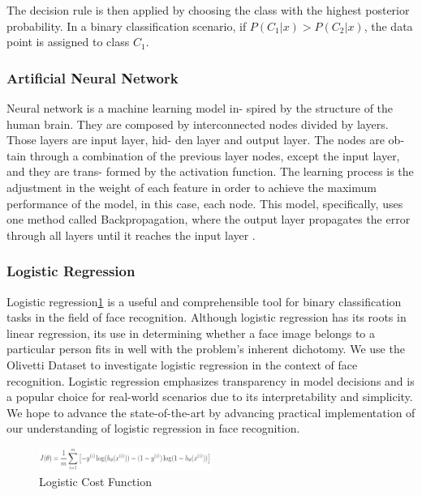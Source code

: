 \documentclass[12pt,a4paper,twocolumn]{article}
\begin{document}
The decision rule is then applied by choosing the class with the highest posterior probability. In a binary classification scenario, if \( P(C_1 | x) > P(C_2 | x) \), the data point is assigned to class \( C_1 \).
\cite{scikit-learn}
\subsubsection{Artificial Neural Network}
\par Neural network is a machine learning model in-
spired by the structure of the human brain. They
are composed by interconnected nodes divided
by layers. Those layers are input layer, hid-
den layer and output layer. The nodes are ob-
tain through a combination of the previous layer
nodes, except the input layer, and they are trans-
formed by the activation function.
The learning process is the adjustment in the
weight of each feature in order to achieve the
maximum performance of the model, in this
case, each node. This model, specifically, uses
one method called Backpropagation, where the
output layer propagates the error through all
layers until it reaches the input layer .

\subsubsection{Logistic Regression}
Logistic regression\ref{fig:cost_func} is a useful and comprehensible tool for binary classification tasks in the field of face recognition. Although logistic regression has its roots in linear regression, its use in determining whether a face image belongs to a particular person fits in well with the problem's inherent dichotomy. We use the Olivetti Dataset to investigate logistic regression in the context of face recognition. Logistic regression emphasizes transparency in model decisions and is a popular choice for real-world scenarios due to its interpretability and simplicity. We hope to advance the state-of-the-art by advancing practical implementation of our understanding of logistic regression in face recognition.
\begin{figure}[H]
\includegraphics[width=0.5\textwidth]{images2/Screenshot from 2023-11-05 21-14-53.png}
\centering
\caption{\label{fig:cost_func} Logistic Cost Function}
\end{figure}
\end{document}
